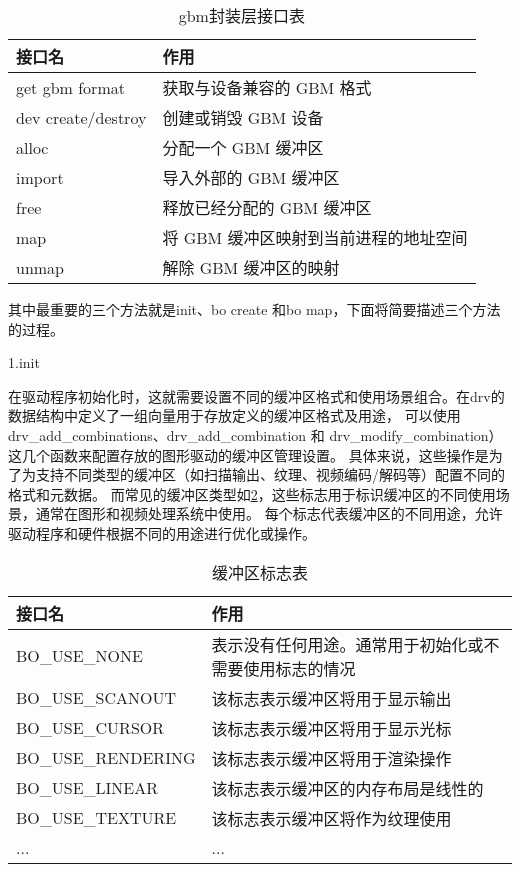 \begin{table}[h]  
  \centering
  \caption{gbm封装层接口表}
  \label{tab:gbm封装层接口表}
  \begin{tabular}{ll}
    \toprule
    接口名  & 作用\\
    \midrule
    get gbm format & 获取与设备兼容的 GBM 格式 \\
    dev create/destroy & 创建或销毁 GBM 设备 \\
    alloc & 分配一个 GBM 缓冲区 \\
    import & 导入外部的 GBM 缓冲区 \\
    free & 释放已经分配的 GBM 缓冲区 \\
    map & 将 GBM 缓冲区映射到当前进程的地址空间 \\
    unmap & 解除 GBM 缓冲区的映射 \\
    \bottomrule
  \end{tabular}
  \note{}
\end{table}

其中最重要的三个方法就是init、bo create 和bo map，下面将简要描述三个方法的过程。

1.init

在驱动程序初始化时，这就需要设置不同的缓冲区格式和使用场景组合。在drv的数据结构中定义了一组向量用于存放定义的缓冲区格式及用途，
可以使用drv\_add\_combinations、drv\_add\_combination 和 drv\_modify\_combination）这几个函数来配置存放的图形驱动的缓冲区管理设置。
具体来说，这些操作是为了为支持不同类型的缓冲区（如扫描输出、纹理、视频编码/解码等）配置不同的格式和元数据。
而常见的缓冲区类型如\ref{tab:缓冲区标志表}，这些标志用于标识缓冲区的不同使用场景，通常在图形和视频处理系统中使用。
每个标志代表缓冲区的不同用途，允许驱动程序和硬件根据不同的用途进行优化或操作。

\begin{table}[h]  
  \centering
  \caption{缓冲区标志表}
  \label{tab:缓冲区标志表}
  \begin{tabular}{ll}
    \toprule
    接口名  & 作用\\
    \midrule
    BO\_USE\_NONE & 表示没有任何用途。通常用于初始化或不需要使用标志的情况 \\
    BO\_USE\_SCANOUT & 该标志表示缓冲区将用于显示输出 \\
    BO\_USE\_CURSOR & 该标志表示缓冲区将用于显示光标 \\
    BO\_USE\_RENDERING & 该标志表示缓冲区将用于渲染操作 \\
    BO\_USE\_LINEAR & 该标志表示缓冲区的内存布局是线性的 \\
    BO\_USE\_TEXTURE & 该标志表示缓冲区将作为纹理使用 \\
    ... & ... \\
    \bottomrule
  \end{tabular}
  \note{}
\end{table}

